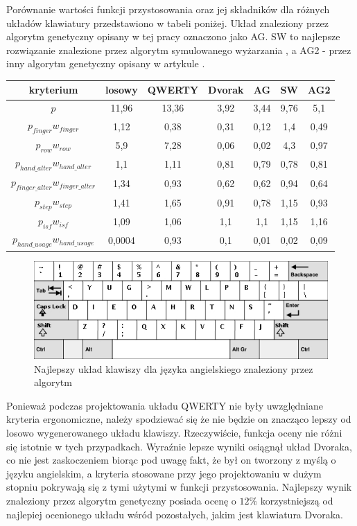 \documentclass[brudnopis]{xmgr}
\begin{document}
Porównanie wartości funkcji przystosowania oraz jej składników dla różnych układów klawiatury przedstawiono w tabeli poniżej. Układ znaleziony przez algorytm genetyczny opisany w tej pracy oznaczono jako AG. SW to najlepsze rozwiązanie znalezione przez algorytm symulowanego wyżarzania \cite{Anderson:SimulatedAnnealing}, a AG2 - przez inny algorytm genetyczny opisany w artykule \cite{Call:2005:CME}.
\newline
\begin{tabular}{ c | c | c | c | c | c | c }
  kryterium            & losowy & QWERTY & Dvorak & AG & SW   & AG2 \\
  \hline
  $p$			&  11,96 & 13,36 & 3,92 & 3,44 & 9,76 & 5,1 \\
  \hline
  $p_{finger} w_{finger}$                &   1,12 &  0,38 & 0,31 & 0,12 &  1,4 & 0,49 \\
  $p_{row} w_{row}$                      &    5,9 &  7,28 & 0,06 & 0,02 &  4,3 & 0,97 \\
  $p_{hand\_alter} w_{hand\_alter}$      &    1,1 &  1,11 & 0,81 & 0,79 & 0,78 & 0,81 \\
  $p_{finger\_alter} w_{finger\_alter}$  &   1,34 &  0,93 & 0,62 & 0,62 & 0,94 & 0,64 \\
  $p_{step} w_{step}$                    &   1,41 &  1,65 & 0,91 & 0,78 & 1,15 & 0,93 \\
  $p_{isf} w_{isf}$                      &   1,09 &  1,06 &  1,1 &  1,1 & 1,15 & 1,16 \\
  $p_{hand\_usage} w_{hand\_usage}$      & 0,0004 &  0,93 &  0,1 & 0,01 & 0,02 & 0,09 \\
\end{tabular}\newline\newline

\begin{figure}[!tbh]
\centering
\includegraphics[width=.8\hsize]{fig/best_en}
\caption{Najlepszy układ klawiszy dla języka angielskiego znaleziony przez algorytm}
\end{figure}

Ponieważ podczas projektowania układu QWERTY nie były uwzględniane kryteria ergonomiczne, należy spodziewać się że nie będzie on znacząco lepszy od losowo wygenerowanego układu klawiszy. Rzeczywiście, funkcja oceny nie różni się istotnie w tych przypadkach. Wyraźnie lepsze wyniki osiągnął układ Dvoraka, co nie jest zaskoczeniem biorąc pod uwagę fakt, że był on tworzony z myślą o języku angielskim, a kryteria stosowane przy jego projektowaniu w dużym stopniu pokrywają się z tymi użytymi w funkcji przystosowania. Najlepszy wynik znaleziony przez algorytm genetyczny posiada ocenę o $12\%$ korzystniejszą od najlepiej ocenionego układu wśród pozostałych, jakim jest klawiatura Dvoraka.
\end{document}
